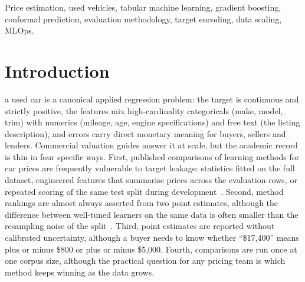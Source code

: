\documentclass[journal,10pt]{IEEEtran}
\begin{document}
\begin{abstract}
\end{abstract}

\begin{IEEEkeywords}
Price estimation, used vehicles, tabular machine learning, gradient boosting, conformal prediction, evaluation methodology, target encoding, data scaling, MLOps.
\end{IEEEkeywords}

\section{Introduction}
 a used car is a canonical applied regression problem: the target is continuous and strictly positive, the features mix high-cardinality categoricals (make, model, trim) with numerics (mileage, age, engine specifications) and free text (the listing description), and errors carry direct monetary meaning for buyers, sellers and lenders. Commercial valuation guides answer it at scale, but the academic record is thin in four specific ways. First, published comparisons of learning methods for car prices are frequently vulnerable to target leakage: statistics fitted on the full dataset, engineered features that summarise prices across the evaluation rows, or repeated scoring of the same test split during development~\cite{kaufman2012,cawley2010}. Second, method rankings are almost always asserted from two point estimates, although the difference between well-tuned learners on the same data is often smaller than the resampling noise of the split~\cite{dietterich1998}. Third, point estimates are reported without calibrated uncertainty, although a buyer needs to know whether ``\$17,400'' means plus or minus \$800 or plus or minus \$5,000. Fourth, comparisons are run once at one corpus size, although the practical question for any pricing team is which method keeps winning as the data grows.
\end{document}
